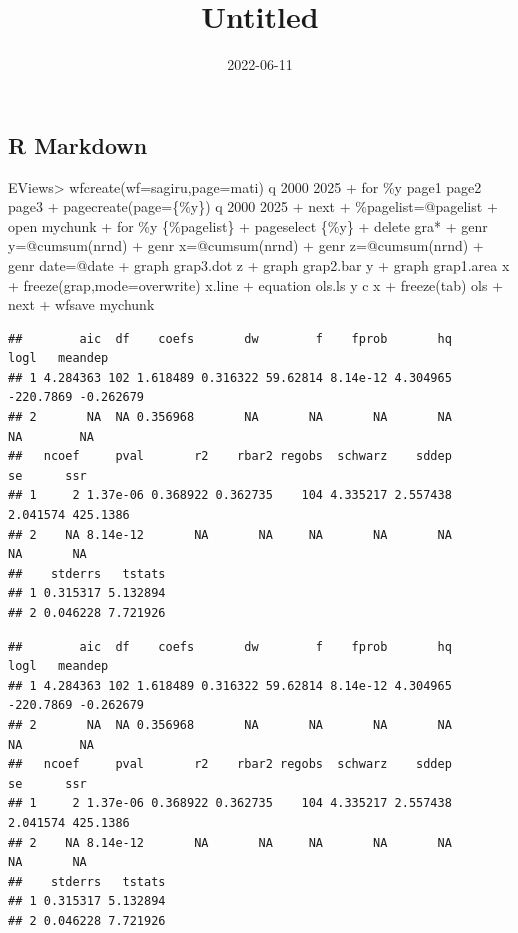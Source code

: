 \documentclass[
]{article}
\title{Untitled}
\author{}
\date{\vspace{-2.5em}2022-06-11}
\newenvironment{Shaded}{\begin{snugshade}}{\end{snugshade}}
\newcommand{\NormalTok}[1]{#1}
\begin{document}
\maketitle

{
\setcounter{tocdepth}{2}
\tableofcontents
}
\hypertarget{r-markdown}{%
\subsection{R Markdown}\label{r-markdown}}

\begin{Shaded}
\begin{Highlighting}[]
\NormalTok{EViews\textgreater{} wfcreate(wf=sagiru,page=mati) q 2000 2025}
\NormalTok{+ for \%y page1 page2 page3  }
\NormalTok{+ pagecreate(page=\{\%y\}) q 2000 2025}
\NormalTok{+ next}
\NormalTok{+ \%pagelist=@pagelist}
\NormalTok{+ \textquotesingle{}open mychunk}
\NormalTok{+ for \%y \{\%pagelist\}}
\NormalTok{+ pageselect \{\%y\}}
\NormalTok{+ \textquotesingle{}delete gra*}
\NormalTok{+ genr y=@cumsum(nrnd)}
\NormalTok{+ genr x=@cumsum(nrnd)}
\NormalTok{+ genr z=@cumsum(nrnd)}
\NormalTok{+ genr date=@date}
\NormalTok{+                      graph grap3.dot z  }
\NormalTok{+                            graph grap2.bar y }
\NormalTok{+                            graph grap1.area x  }
\NormalTok{+    freeze(grap,mode=overwrite) x.line}
\NormalTok{+ equation ols.ls y c x}
\NormalTok{+ freeze(tab) ols}
\NormalTok{+ next}
\NormalTok{+ wfsave mychunk}
\end{Highlighting}
\end{Shaded}

\begin{verbatim}
##        aic  df    coefs       dw        f    fprob       hq      logl   meandep
## 1 4.284363 102 1.618489 0.316322 59.62814 8.14e-12 4.304965 -220.7869 -0.262679
## 2       NA  NA 0.356968       NA       NA       NA       NA        NA        NA
##   ncoef     pval       r2    rbar2 regobs  schwarz    sddep       se      ssr
## 1     2 1.37e-06 0.368922 0.362735    104 4.335217 2.557438 2.041574 425.1386
## 2    NA 8.14e-12       NA       NA     NA       NA       NA       NA       NA
##    stderrs   tstats
## 1 0.315317 5.132894
## 2 0.046228 7.721926
\end{verbatim}

\begin{verbatim}
##        aic  df    coefs       dw        f    fprob       hq      logl   meandep
## 1 4.284363 102 1.618489 0.316322 59.62814 8.14e-12 4.304965 -220.7869 -0.262679
## 2       NA  NA 0.356968       NA       NA       NA       NA        NA        NA
##   ncoef     pval       r2    rbar2 regobs  schwarz    sddep       se      ssr
## 1     2 1.37e-06 0.368922 0.362735    104 4.335217 2.557438 2.041574 425.1386
## 2    NA 8.14e-12       NA       NA     NA       NA       NA       NA       NA
##    stderrs   tstats
## 1 0.315317 5.132894
## 2 0.046228 7.721926
\end{verbatim}
\end{document}
